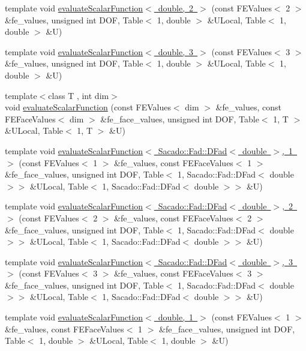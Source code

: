 \begin{DoxyCompactItemize}
\item 
template void \mbox{\hyperlink{function_evaluations_8cc_a675557db3f31c27e2c45a8bee20dd42a}{evaluate\+Scalar\+Function$<$ double, 2 $>$}} (const F\+E\+Values$<$ 2 $>$ \&fe\+\_\+values, unsigned int D\+OF, Table$<$ 1, double $>$ \&U\+Local, Table$<$ 1, double $>$ \&U)
\item 
template void \mbox{\hyperlink{function_evaluations_8cc_acf0861a6c93d4385e4738cd36457969d}{evaluate\+Scalar\+Function$<$ double, 3 $>$}} (const F\+E\+Values$<$ 3 $>$ \&fe\+\_\+values, unsigned int D\+OF, Table$<$ 1, double $>$ \&U\+Local, Table$<$ 1, double $>$ \&U)
\item 
{\footnotesize template$<$class T , int dim$>$ }\\void \mbox{\hyperlink{group___evaluation_functions_ga2e2fbeb2173113c6889c73bbb7304789}{evaluate\+Scalar\+Function}} (const F\+E\+Values$<$ dim $>$ \&fe\+\_\+values, const F\+E\+Face\+Values$<$ dim $>$ \&fe\+\_\+face\+\_\+values, unsigned int D\+OF, Table$<$ 1, T $>$ \&U\+Local, Table$<$ 1, T $>$ \&U)
\item 
template void \mbox{\hyperlink{function_evaluations_8cc_aba734fcd49b3387c248667715e27f4d8}{evaluate\+Scalar\+Function$<$ Sacado\+::\+Fad\+::\+D\+Fad$<$ double $>$, 1 $>$}} (const F\+E\+Values$<$ 1 $>$ \&fe\+\_\+values, const F\+E\+Face\+Values$<$ 1 $>$ \&fe\+\_\+face\+\_\+values, unsigned int D\+OF, Table$<$ 1, Sacado\+::\+Fad\+::\+D\+Fad$<$ double $>$$>$ \&U\+Local, Table$<$ 1, Sacado\+::\+Fad\+::\+D\+Fad$<$ double $>$$>$ \&U)
\item 
template void \mbox{\hyperlink{function_evaluations_8cc_ad678c1a358c17bdfbe0ddebfc9936057}{evaluate\+Scalar\+Function$<$ Sacado\+::\+Fad\+::\+D\+Fad$<$ double $>$, 2 $>$}} (const F\+E\+Values$<$ 2 $>$ \&fe\+\_\+values, const F\+E\+Face\+Values$<$ 2 $>$ \&fe\+\_\+face\+\_\+values, unsigned int D\+OF, Table$<$ 1, Sacado\+::\+Fad\+::\+D\+Fad$<$ double $>$$>$ \&U\+Local, Table$<$ 1, Sacado\+::\+Fad\+::\+D\+Fad$<$ double $>$$>$ \&U)
\item 
template void \mbox{\hyperlink{function_evaluations_8cc_aff733718e441e77597fb5f7369b962d7}{evaluate\+Scalar\+Function$<$ Sacado\+::\+Fad\+::\+D\+Fad$<$ double $>$, 3 $>$}} (const F\+E\+Values$<$ 3 $>$ \&fe\+\_\+values, const F\+E\+Face\+Values$<$ 3 $>$ \&fe\+\_\+face\+\_\+values, unsigned int D\+OF, Table$<$ 1, Sacado\+::\+Fad\+::\+D\+Fad$<$ double $>$$>$ \&U\+Local, Table$<$ 1, Sacado\+::\+Fad\+::\+D\+Fad$<$ double $>$$>$ \&U)
\item 
template void \mbox{\hyperlink{function_evaluations_8cc_a1b7c8170a7edbde30679da8b7f16d53b}{evaluate\+Scalar\+Function$<$ double, 1 $>$}} (const F\+E\+Values$<$ 1 $>$ \&fe\+\_\+values, const F\+E\+Face\+Values$<$ 1 $>$ \&fe\+\_\+face\+\_\+values, unsigned int D\+OF, Table$<$ 1, double $>$ \&U\+Local, Table$<$ 1, double $>$ \&U)

\end{DoxyCompactItemize}
